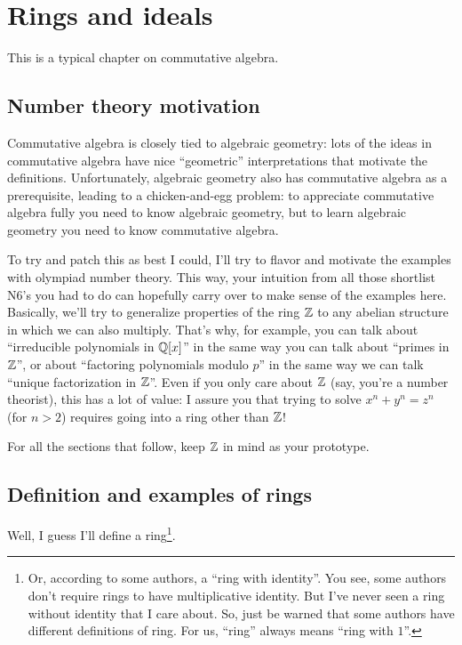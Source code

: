 \chapter{Rings and ideals}
This is a typical chapter on commutative algebra.

\section{Number theory motivation}
Commutative algebra is closely tied to algebraic geometry:
lots of the ideas in commutative algebra have nice ``geometric'' interpretations that motivate the definitions.
Unfortunately, algebraic geometry also has commutative algebra as a prerequisite, leading to a
chicken-and-egg problem: to appreciate commutative algebra fully you need to know algebraic geometry,
but to learn algebraic geometry you need to know commutative algebra.

To try and patch this as best I could, I'll try to flavor and motivate the examples with olympiad number theory.
This way, your intuition from all those shortlist N6's
you had to do can hopefully carry over to make sense of the examples here.
Basically, we'll try to generalize properties of the ring $\mathbb Z$ to
any abelian structure in which we can also multiply.
That's why, for example, you can talk about ``irreducible polynomials in $\mathbb Q[x]$'' in the same
way you can talk about ``primes in $\mathbb Z$'', or about ``factoring polynomials modulo $p$''
in the same way we can talk ``unique factorization in $\mathbb Z$''.
Even if you only care about $\mathbb Z$ (say, you're a number theorist), this has a lot of value:
I assure you that trying to solve $x^n+y^n = z^n$ (for $n > 2$) requires going into a ring other than $\mathbb Z$!

For all the sections that follow, keep $\mathbb Z$ in mind as your prototype.

\section{Definition and examples of rings}

Well, I guess I'll define a ring\footnote{%
	Or, according to some authors, a ``ring with identity''.
	You see, some authors don't require rings to have multiplicative identity.
	But I've never seen a ring without identity that I care about.
	So, just be warned that some authors have different definitions of ring.
	For us, ``ring'' always means ``ring with $1$''.}.

